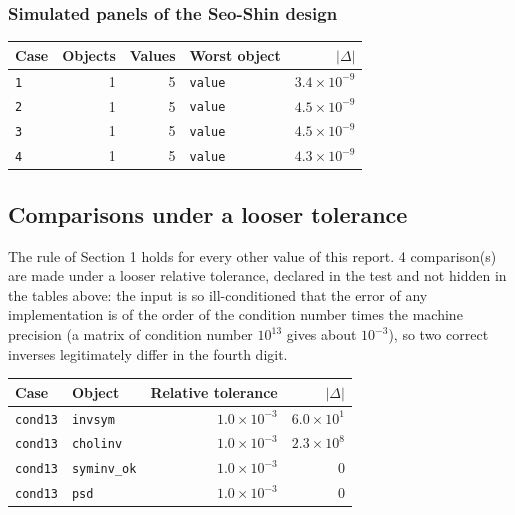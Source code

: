 \documentclass[
  10.5pt,
  a4paper,
]{article}
\begin{document}
\subsubsection*{Simulated panels of the Seo-Shin design}

\begin{longtable}{@{}p{3.6cm}rrp{4.9cm}r@{}}
\toprule
Case & Objects & Values & Worst object & $|\Delta|$ \\
\midrule
\endhead
\texttt{1} & 1 & 5 & \texttt{value} & $3.4\times10^{-9}$ \\
\texttt{2} & 1 & 5 & \texttt{value} & $4.5\times10^{-9}$ \\
\texttt{3} & 1 & 5 & \texttt{value} & $4.5\times10^{-9}$ \\
\texttt{4} & 1 & 5 & \texttt{value} & $4.3\times10^{-9}$ \\
\bottomrule
\end{longtable}

\subsection{Comparisons under a looser tolerance}
The rule of Section 1 holds for every other value of this report. 4 comparison(s) are made under a looser relative tolerance, declared in the test and not hidden in the tables above: the input is so ill-conditioned that the error of any implementation is of the order of the condition number times the machine precision (a matrix of condition number $10^{13}$ gives about $10^{-3}$), so two correct inverses legitimately differ in the fourth digit.
\begin{longtable}{@{}p{3cm}p{3cm}rr@{}}
\toprule
Case & Object & Relative tolerance & $|\Delta|$ \\
\midrule
\endhead
\texttt{cond13} & \texttt{invsym} & $1.0\times10^{-3}$ & $6.0\times10^{1}$ \\
\texttt{cond13} & \texttt{cholinv} & $1.0\times10^{-3}$ & $2.3\times10^{8}$ \\
\texttt{cond13} & \texttt{syminv\_\allowbreak{}ok} & $1.0\times10^{-3}$ & 0 \\
\texttt{cond13} & \texttt{psd} & $1.0\times10^{-3}$ & 0 \\
\bottomrule
\end{longtable}
\end{document}
